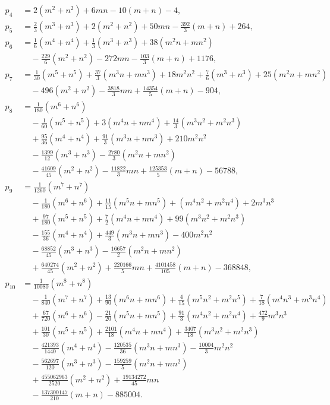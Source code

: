 \documentclass[11pt]{article}
\theoremstyle{definition}
\theoremstyle{remark}
\begin{document}
{\allowdisplaybreaks
\begin{align*}
  p_4 &= 2(m^2+n^2) + 6mn - 10(m+n) - 4,\\
  p_5 &= \tfrac{2}{3}(m^3+n^3) + 2(m^2+n^2) + 50mn - \tfrac{392}{3}(m+n) + 264,\\
  p_6 &= \tfrac{1}{6}(m^4+n^4) + \tfrac{1}{3}(m^3+n^3) + 38(m^2n+mn^2)\\
      &\quad{} - \tfrac{229}{6}(m^2+n^2) - 272mn - \tfrac{103}{3}(m+n) + 1176,\\
  p_7 &= \tfrac{1}{30}(m^5+n^5) + \tfrac{37}{3}(m^3n+mn^3) + 18m^2n^2
         + \tfrac{7}{6}(m^3+n^3) + 25(m^2n+mn^2)\\
      &\quad{} - 496(m^2+n^2) - \tfrac{3818}{3}mn + \tfrac{14354}{5}(m+n) - 904,\\
  p_8 &= \tfrac{1}{180}(m^6+n^6)\\
      &\quad{} - \tfrac{1}{60}(m^5+n^5) + 3(m^4n+mn^4) + \tfrac{14}{3}(m^3n^2+m^2n^3)\\
      &\quad{} + \tfrac{95}{36}(m^4+n^4) + \tfrac{91}{3}(m^3n+mn^3) + 210 m^2n^2\\
      &\quad{} - \tfrac{1399}{12}(m^3+n^3) - \tfrac{2780}{3}(m^2n+mn^2)\\
      &\quad{} - \tfrac{41609}{45}(m^2+n^2) - \tfrac{11822}{3}mn
        + \tfrac{125353}{5}(m+n) - 56788,\\
  p_9 &= \tfrac{1}{1260}(m^7+n^7)\\
      &\quad{} - \tfrac{1}{180}(m^6+n^6) + \tfrac{11}{15}(m^5n+mn^5)
        + (m^4n^2+m^2n^4) + 2m^3n^3\\
      &\quad{} + \tfrac{97}{180}(m^5+n^5) + \tfrac{7}{2}(m^4n+mn^4)
        + 99(m^3n^2+m^2n^3)\\
      &\quad{} - \tfrac{155}{36}(m^4+n^4) + \tfrac{449}{3}(m^3n+mn^3) - 400 m^2n^2\\
      &\quad{} - \tfrac{68852}{45}(m^3+n^3) - \tfrac{16657}{2}(m^2n+mn^2)\\
      &\quad{} + \tfrac{640274}{45}(m^2+n^2) + \tfrac{220166}{5}mn
        + \tfrac{4101458}{105}(m+n) - 368848,\\
  p_{10} &= \tfrac{1}{10080}(m^8+n^8)\\
         &\quad{} - \tfrac{1}{840}(m^7+n^7) + \tfrac{13}{90}(m^6n+mn^6)
           + \tfrac{4}{15}(m^5n^2+m^2n^5) + \tfrac{7}{18}(m^4n^3+m^3n^4)\\
         &\quad{} + \tfrac{67}{720}(m^6+n^6) - \tfrac{21}{20}(m^5n+mn^5)
           + \tfrac{91}{3}(m^4n^2+m^2n^4) + \tfrac{472}{9}m^3n^3\\
         &\quad{} + \tfrac{101}{30}(m^5+n^5) + \tfrac{2101}{18}(m^4n+mn^4)
           + \tfrac{3407}{18}(m^3n^2+m^2n^3)\\
         &\quad{} - \tfrac{421393}{1440}(m^4+n^4) - \tfrac{120535}{36}(m^3n+mn^3)
           - \tfrac{10004}{3}m^2n^2\\
         &\quad{} - \tfrac{562697}{120}(m^3+n^3) - \tfrac{159259}{5}(m^2n+mn^2)\\
         &\quad{} + \tfrac{455062963}{2520}(m^2+n^2) + \tfrac{19134272}{45}mn\\
         &\quad{} - \tfrac{137300147}{210}(m+n) - 885004.
\end{align*}}%
\end{document}
